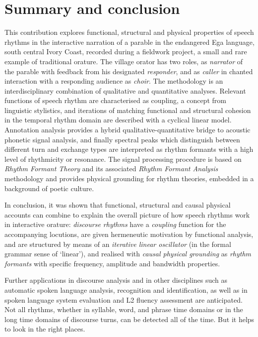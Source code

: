 \documentclass[output=paper,colorlinks,citecolor=brown]{langscibook}
\begin{document}
\section{Summary and conclusion}
\begin{sloppypar}
This contribution explores functional, structural and physical properties of speech rhythms in the interactive narration of a parable in the endangered Ega language, south central Ivory Coast, recorded during a fieldwork project, a small and rare example of traditional orature. The village orator has two roles, as \textit{narrator} of the parable with feedback from his designated \textit{responder}, and as \textit{caller} in chanted interaction with a responding audience as \textit{choir}.  The methodology is an interdisciplinary combination of qualitative and quantitative analyses. Relevant functions of speech rhythm are characterised as coupling, a concept from linguistic stylistics, and iterations of matching functional and structural cohesion in the temporal rhythm domain are described with a cyclical linear model. Annotation analysis provides a hybrid qualitative-quantitative bridge to acoustic phonetic signal analysis, and finally spectral peaks which distinguish between different turn and exchange types are interpreted as rhythm formants with a high level of rhythmicity or resonance. The signal processing procedure is based on \textit{Rhythm Formant Theory} and its associated \textit{Rhythm Formant Analysis} methodology and provides physical grounding for rhythm theories, embedded in a background of poetic culture.
\end{sloppypar}

In conclusion, it was shown that functional, structural and causal physical accounts can combine to explain the overall picture of how speech rhythms work in interactive orature: \textit{discourse rhythms} have a \textit{coupling} function for the accompanying locutions, are given hermeneutic motivation by functional analysis, and are structured by means of an \textit{iterative linear oscillator} (in the formal grammar sense of `linear'), and realised with \textit{causal physical grounding} as \textit{rhythm formants} with specific frequency, amplitude and bandwidth properties.

Further applications in discourse analysis and in other disciplines such as automatic spoken language analysis, recognition and identification, as well as in spoken language system evaluation and L2 fluency assessment are anticipated. Not all rhythms, whether in syllable, word, and phrase time domains or in the long time domains of discourse turns, can be detected all of the time. But it helps to look in the right places.
\end{document}
